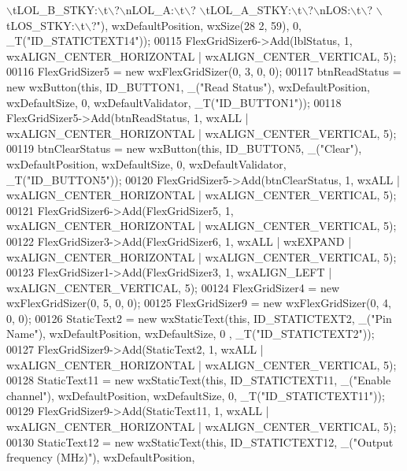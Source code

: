 \begin{DoxyCode}
{       \(\backslash\)tLOL\_B\_STKY:\(\backslash\)t\(\backslash\)?\(\backslash\)nLOL\_A:\(\backslash\)t\(\backslash\)?  \(\backslash\)tLOL\_A\_STKY:\(\backslash\)t\(\backslash\)?\(\backslash\)nLOS:\(\backslash\)t\(\backslash\)?  \(\backslash\)tLOS\_STKY:\(\backslash\)t\(\backslash\)?"}), wxDefaultPosition, wxSize(28
      2, 59), 0, \_T(\textcolor{stringliteral}{"ID\_STATICTEXT14"}));
00115     FlexGridSizer6->Add(lblStatus, 1, wxALIGN\_CENTER\_HORIZONTAL | wxALIGN\_CENTER\_VERTICAL, 5);
00116     FlexGridSizer5 = \textcolor{keyword}{new} wxFlexGridSizer(0, 3, 0, 0);
00117     btnReadStatus = \textcolor{keyword}{new} wxButton(\textcolor{keyword}{this}, ID\_BUTTON1, \_(\textcolor{stringliteral}{"Read Status"}), wxDefaultPosition, wxDefaultSize, 0, 
      wxDefaultValidator, \_T(\textcolor{stringliteral}{"ID\_BUTTON1"}));
00118     FlexGridSizer5->Add(btnReadStatus, 1, wxALL | wxALIGN\_CENTER\_HORIZONTAL | wxALIGN\_CENTER\_VERTICAL, 5);
00119     btnClearStatus = \textcolor{keyword}{new} wxButton(\textcolor{keyword}{this}, ID\_BUTTON5, \_(\textcolor{stringliteral}{"Clear"}), wxDefaultPosition, wxDefaultSize, 0, 
      wxDefaultValidator, \_T(\textcolor{stringliteral}{"ID\_BUTTON5"}));
00120     FlexGridSizer5->Add(btnClearStatus, 1, wxALL | wxALIGN\_CENTER\_HORIZONTAL | wxALIGN\_CENTER\_VERTICAL, 5);
00121     FlexGridSizer6->Add(FlexGridSizer5, 1, wxALIGN\_CENTER\_HORIZONTAL | wxALIGN\_CENTER\_VERTICAL, 5);
00122     FlexGridSizer3->Add(FlexGridSizer6, 1, wxALL | wxEXPAND | wxALIGN\_CENTER\_HORIZONTAL | 
      wxALIGN\_CENTER\_VERTICAL, 5);
00123     FlexGridSizer1->Add(FlexGridSizer3, 1, wxALIGN\_LEFT | wxALIGN\_CENTER\_VERTICAL, 5);
00124     FlexGridSizer4 = \textcolor{keyword}{new} wxFlexGridSizer(0, 5, 0, 0);
00125     FlexGridSizer9 = \textcolor{keyword}{new} wxFlexGridSizer(0, 4, 0, 0);
00126     StaticText2 = \textcolor{keyword}{new} wxStaticText(\textcolor{keyword}{this}, ID\_STATICTEXT2, \_(\textcolor{stringliteral}{"Pin Name"}), wxDefaultPosition, wxDefaultSize, 0
      , \_T(\textcolor{stringliteral}{"ID\_STATICTEXT2"}));
00127     FlexGridSizer9->Add(StaticText2, 1, wxALL | wxALIGN\_CENTER\_HORIZONTAL | wxALIGN\_CENTER\_VERTICAL, 5);
00128     StaticText11 = \textcolor{keyword}{new} wxStaticText(\textcolor{keyword}{this}, ID\_STATICTEXT11, \_(\textcolor{stringliteral}{"Enable channel"}), wxDefaultPosition, 
      wxDefaultSize, 0, \_T(\textcolor{stringliteral}{"ID\_STATICTEXT11"}));
00129     FlexGridSizer9->Add(StaticText11, 1, wxALL | wxALIGN\_CENTER\_HORIZONTAL | wxALIGN\_CENTER\_VERTICAL, 5);
00130     StaticText12 = \textcolor{keyword}{new} wxStaticText(\textcolor{keyword}{this}, ID\_STATICTEXT12, \_(\textcolor{stringliteral}{"Output frequency (MHz)"}), wxDefaultPosition, 

\end{DoxyCode}
